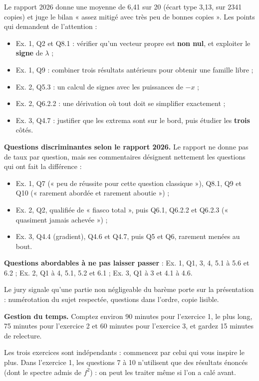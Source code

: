\documentclass[11pt,a4paper]{article}
\providecommand{\tightlist}{\setlength{\itemsep}{0pt}\setlength{\parskip}{0pt}}
\begin{document}
Le rapport 2026 donne une moyenne de 6,41 sur 20 (écart type 3,13, sur 2341 copies) et juge le bilan « assez mitigé avec très peu de bonnes copies ». Les points qui demandent de l'attention :

\begin{itemize}
\tightlist
\item
  Ex. 1, Q2 et Q8.1 : vérifier qu'un vecteur propre est \textbf{non nul}, et exploiter le \textbf{signe} de \(\lambda\) ;
\item
  Ex. 1, Q9 : combiner trois résultats antérieurs pour obtenir une famille libre ;
\item
  Ex. 2, Q5.3 : un calcul de signes avec les puissances de \(-x\) ;
\item
  Ex. 2, Q6.2.2 : une dérivation où tout doit se simplifier exactement ;
\item
  Ex. 3, Q4.7 : justifier que les extrema sont sur le bord, puis étudier les \textbf{trois} côtés.
\end{itemize}

\textbf{Questions discriminantes selon le rapport 2026.} Le rapport ne donne pas de taux par question, mais ses commentaires désignent nettement les questions qui ont fait la différence :

\begin{itemize}
\tightlist
\item
  Ex. 1, Q7 (« peu de réussite pour cette question classique »), Q8.1, Q9 et Q10 (« rarement abordée et rarement aboutie ») ;
\item
  Ex. 2, Q2, qualifiée de « fiasco total », puis Q6.1, Q6.2.2 et Q6.2.3 (« quasiment jamais achevée ») ;
\item
  Ex. 3, Q4.4 (gradient), Q4.6 et Q4.7, puis Q5 et Q6, rarement menées au bout.
\end{itemize}

\textbf{Questions abordables à ne pas laisser passer} : Ex. 1, Q1, 3, 4, 5.1 à 5.6 et 6.2 ; Ex. 2, Q1 à 4, 5.1, 5.2 et 6.1 ; Ex. 3, Q1 à 3 et 4.1 à 4.6.

Le jury signale qu'une partie non négligeable du barème porte sur la présentation : numérotation du sujet respectée, questions dans l'ordre, copie lisible.

\textbf{Gestion du temps.} Comptez environ 90 minutes pour l'exercice 1, le plus long, 75 minutes pour l'exercice 2 et 60 minutes pour l'exercice 3, et gardez 15 minutes de relecture.

Les trois exercices sont indépendants : commencez par celui qui vous inspire le plus. Dans l'exercice 1, les questions 7 à 10 n'utilisent que des résultats énoncés (dont le spectre admis de \(f^2\)) : on peut les traiter même si l'on a calé avant.
\end{document}

